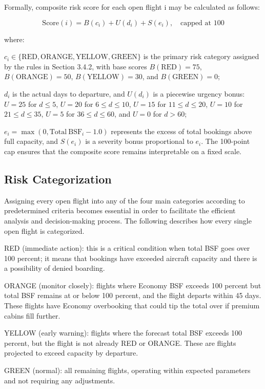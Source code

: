 Formally, composite risk score for each open flight i may be calculated as follows:

\[ \mathrm{Score}(i) = B(c_i) + U(d_i) + S(e_i), \quad \text{capped at } 100 \]

where:

$c_i \in \{\text{RED}, \text{ORANGE}, \text{YELLOW}, \text{GREEN}\}$ is the primary risk category assigned by the rules in Section 3.4.2, with base scores $B(\text{RED}) = 75$, $B(\text{ORANGE}) = 50$, $B(\text{YELLOW}) = 30$, and $B(\text{GREEN}) = 0$;

$d_i$ is the actual days to departure, and $U(d_i)$ is a piecewise urgency bonus: $U = 25$ for $d \leq 5$, $U = 20$ for $6 \leq d \leq 10$, $U = 15$ for $11 \leq d \leq 20$, $U = 10$ for $21 \leq d \leq 35$, $U = 5$ for $36 \leq d \leq 60$, and $U = 0$ for $d > 60$;

$e_i = \max(0, \mathrm{Total\ BSF}_i - 1.0)$ represents the excess of total bookings above full capacity, and $S(e_i)$ is a severity bonus proportional to $e_i$. The 100-point cap ensures that the composite score remains interpretable on a fixed scale.

\subsection{Risk Categorization}

Assigning every open flight into any of the four main categories according to predetermined criteria becomes essential in order to facilitate the efficient analysis and decision-making process. The following describes how every single open flight is categorized.

RED (immediate action): this is a critical condition when total BSF goes over 100 percent; it means that bookings have exceeded aircraft capacity and there is a possibility of denied boarding.

ORANGE (monitor closely): flights where Economy BSF exceeds 100 percent but total BSF remains at or below 100 percent, and the flight departs within 45 days. These flights have Economy overbooking that could tip the total over if premium cabins fill further.

YELLOW (early warning): flights where the forecast total BSF exceeds 100 percent, but the flight is not already RED or ORANGE. These are flights projected to exceed capacity by departure.

GREEN (normal): all remaining flights, operating within expected parameters and not requiring any adjustments.

